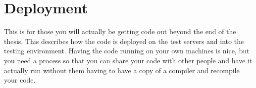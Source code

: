\chapter{Deployment}
\label{chap:deployment}
This is for those you will actually be getting code out beyond the end of the thesis.  This describes how the code is deployed on the test servers and into the testing environment.  Having the code running on your own machines is nice, but you need a process so that you can share your code with other people and have it actually run without them having to have a copy of a compiler and recompile your code.

